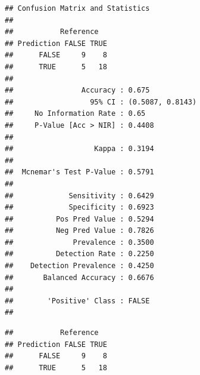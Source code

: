 \documentclass[
]{article}
\newenvironment{Shaded}{\begin{snugshade}}{\end{snugshade}}
\newcommand{\AttributeTok}[1]{\textcolor[rgb]{0.77,0.63,0.00}{#1}}
\newcommand{\FunctionTok}[1]{\textcolor[rgb]{0.00,0.00,0.00}{#1}}
\newcommand{\NormalTok}[1]{#1}
\newcommand{\OtherTok}[1]{\textcolor[rgb]{0.56,0.35,0.01}{#1}}
\newcommand{\SpecialCharTok}[1]{\textcolor[rgb]{0.00,0.00,0.00}{#1}}
\newcommand{\StringTok}[1]{\textcolor[rgb]{0.31,0.60,0.02}{#1}}
\begin{document}
\begin{verbatim}
## Confusion Matrix and Statistics
## 
##           Reference
## Prediction FALSE TRUE
##      FALSE     9    8
##      TRUE      5   18
##                                           
##                Accuracy : 0.675           
##                  95% CI : (0.5087, 0.8143)
##     No Information Rate : 0.65            
##     P-Value [Acc > NIR] : 0.4408          
##                                           
##                   Kappa : 0.3194          
##                                           
##  Mcnemar's Test P-Value : 0.5791          
##                                           
##             Sensitivity : 0.6429          
##             Specificity : 0.6923          
##          Pos Pred Value : 0.5294          
##          Neg Pred Value : 0.7826          
##              Prevalence : 0.3500          
##          Detection Rate : 0.2250          
##    Detection Prevalence : 0.4250          
##       Balanced Accuracy : 0.6676          
##                                           
##        'Positive' Class : FALSE           
## 
\end{verbatim}

\begin{Shaded}
\end{Shaded}

\begin{verbatim}
##           Reference
## Prediction FALSE TRUE
##      FALSE     9    8
##      TRUE      5   18
\end{verbatim}

\begin{Shaded}
\end{Shaded}
\end{document}
